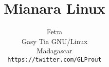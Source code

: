 \title{Mianara Linux}
\date{}
\author{Fetra \\
        Gasy Tia GNU/Linux\\
        Madagascar\\
        \texttt{https://twitter.com/GLProut}
}
